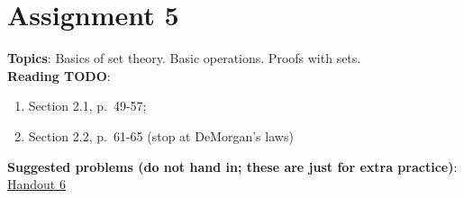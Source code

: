 \documentclass[12pt]{article}
\begin{document}
\section[5 (due \csname dateWeek5\endcsname): Set theory. Basic operations. Proofs with sets.]{Assignment 5}

\textbf{Topics}: Basics of set theory. Basic operations. Proofs with sets.
\\

\noindent \textbf{Reading TODO}:
\begin{enumerate}
\item Section 2.1, p.~49-57; 
\item Section 2.2, p.~61-65 (stop at DeMorgan's laws)
\end{enumerate}




\noindent \textbf{Suggested problems (do not hand in; these are just for extra practice)}: \href{https://www.math.emory.edu/~dzb/teaching/250Fall2021/handouts/250-H06-sets-I.pdf}{Handout 6}
\\


\end{document}
